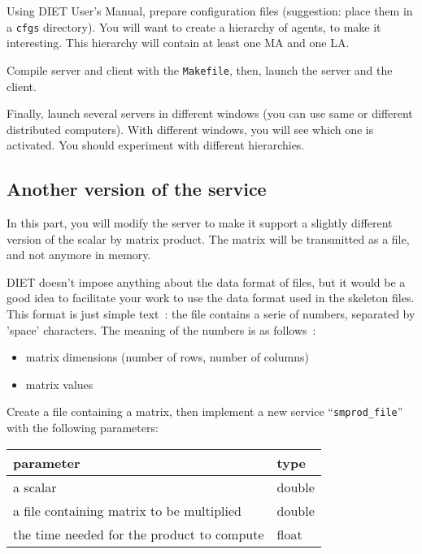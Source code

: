 \documentclass[11pt,a4paper]{article}
\begin{document}
Using DIET User's Manual, prepare configuration files (suggestion:
place them in a \texttt{cfgs} directory). You will want to create a
hierarchy of agents, to make it interesting. This hierarchy will
contain at least one MA and one LA.
\par

Compile server and client with the \texttt{Makefile}, then, launch the server
and the client. \par

Finally, launch several servers in different windows (you can use same
or different distributed computers). With different windows, you will
see which one is activated. You should experiment with different
hierarchies.

\subsection{Another version of the service}

In this part, you will modify the server to make it support a slightly
different version of the scalar by matrix product. The matrix will be
transmitted as a file, and not anymore in memory. \par

DIET doesn't impose anything about the data format of files, but it
would be a good idea to facilitate your work to use the data format
used in the skeleton files. This format is just simple text~: the file
contains a serie of numbers, separated by 'space' characters. The
meaning of the numbers is as follows~:

\begin{itemize}
\item{matrix dimensions (number of rows, number of columns)}
\item{matrix values}
\end{itemize}

\par
Create a file containing a matrix, then implement a new service
``\texttt{smprod\_file}'' with the following parameters:

\begin{center}
\begin{tabular}{|l|l|}
\hline
parameter & type \\
\hline
a scalar & double \\
a file containing matrix to be multiplied & double \\
the time needed for the product to compute & float \\
\hline
\end{tabular}
\end{center}
\end{document}
